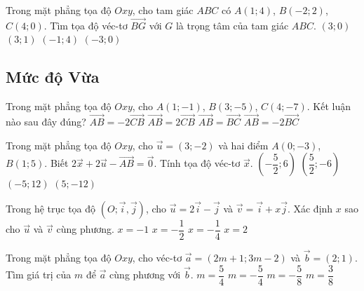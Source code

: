 \begin{ex}%
	Trong mặt phẳng tọa độ $Oxy$, cho tam giác $ABC$ có $A(1;4)$, $B(-2;2)$, $C(4;0)$. Tìm tọa độ véc-tơ $\vec{BG}$ với $G$ là trọng tâm của tam giác $ABC$.
	\choice
	{\True $(3;0)$}
	{$(3;1)$}
	{$(-1;4)$}
	{$(-3;0)$}
\end{ex}


\subsection*{Mức độ Vừa}
\begin{ex}%
	Trong mặt phẳng tọa độ $Oxy$, cho $A(1;-1)$, $B(3;-5)$, $C(4;-7)$. Kết luận nào sau đây đúng?
	\choice
	{\True $\vec{AB}=-2\vec{CB}$}
	{$\vec{AB}=2\vec{CB}$}
	{$\vec{AB}=\vec{BC}$}
	{$\vec{AB}=-2\vec{BC}$}
\end{ex}

\begin{ex}%
	Trong mặt phẳng tọa độ $Oxy$, cho $\vec{u}=(3;-2)$ và hai điểm $A(0;-3)$, $B(1;5)$. Biết $2\vec{x}+2\vec{u}-\vec{AB}=\vec{0}$. Tính tọa độ véc-tơ $\vec{x}$.
	\choice
	{\True $\left( -\dfrac{5}{2};6 \right)$}
	{$\left( \dfrac{5}{2};-6 \right)$}
	{$(-5;12)$}
	{$(5;-12)$}
\end{ex}

\begin{ex}%
	Trong hệ trục tọa độ $(O; \vec{i}, \vec{j})$, cho $\vec{u}=2\vec{i}-\vec{j}$ và $\vec{v}=\vec{i}+x\vec{j}$. Xác định $x$ sao cho $\vec{u}$ và $\vec{v}$ cùng phương.
	\choice
	{$x=-1$}
	{\True $x=-\dfrac{1}{2}$}
	{$x=-\dfrac{1}{4}$}
	{$x=2$}
\end{ex}


\begin{ex}%
	Trong mặt phẳng tọa độ $Oxy$, cho véc-tơ $\vec{a}=(2m+1;3m-2)$ và $\vec{b}=(2;1)$. Tìm giá trị của $m$ để $\vec{a}$ cùng phương với $\vec{b}$.
	\choice
	{\True $m=\dfrac{5}{4}$}
	{$m=-\dfrac{5}{4}$}
	{$m=-\dfrac{5}{8}$}
	{$m=\dfrac{3}{8}$}
\end{ex}

